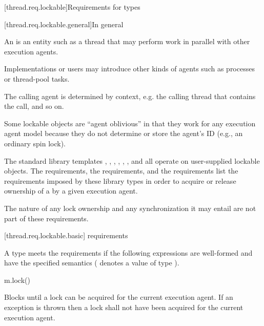 [thread.req.lockable]{Requirements for  types}

[thread.req.lockable.general]{In general}

\pnum
An  is an entity such as a thread that may perform work in parallel with
other execution agents. \begin{note} Implementations or users may introduce other kinds of
agents such as processes or thread-pool tasks. \end{note} The calling agent is determined by
context, e.g. the calling thread that contains the call, and so on.

\pnum
\begin{note} Some lockable objects are ``agent oblivious'' in that they work for any
execution agent model because they do not determine or store the agent's ID (e.g., an
ordinary spin lock). \end{note}

\pnum
The standard library templates ,
,
,
, ,
, and
 all operate on user-supplied
lockable objects. The  requirements, the  requirements,
and the  requirements list the requirements imposed by these library types
in order to acquire or release ownership of a  by a given execution agent.
\begin{note} The nature of any lock ownership and any synchronization it may entail are not part
of these requirements. \end{note}

[thread.req.lockable.basic]{ requirements}

\pnum
A type  meets the  requirements if the following expressions are
well-formed and have the specified semantics ( denotes a value of type ).

\begin{itemdecl}
m.lock()
\end{itemdecl}

\begin{itemdescr}
\pnum
\effects Blocks until a lock can be acquired for the current execution agent. If an exception
is thrown then a lock shall not have been acquired for the current execution agent.
\end{itemdescr}

